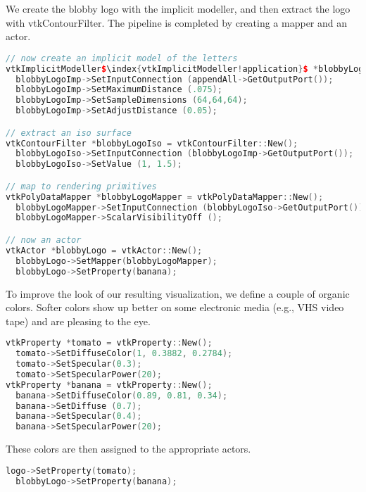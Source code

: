 We create the blobby logo with the implicit modeller, and then extract the logo with vtkContourFilter. The pipeline is completed by creating a mapper and an actor.

\begin{lstlisting}[language=C++, caption={Create an implicit model of the letters and extract the logo.}, escapechar=\$]
// now create an implicit model of the letters
vtkImplicitModeller$\index{vtkImplicitModeller!application}$ *blobbyLogoImp = vtkImplicitModeller::New();
  blobbyLogoImp->SetInputConnection (appendAll->GetOutputPort());
  blobbyLogoImp->SetMaximumDistance (.075);
  blobbyLogoImp->SetSampleDimensions (64,64,64);
  blobbyLogoImp->SetAdjustDistance (0.05);

// extract an iso surface
vtkContourFilter *blobbyLogoIso = vtkContourFilter::New();
  blobbyLogoIso->SetInputConnection (blobbyLogoImp->GetOutputPort());
  blobbyLogoIso->SetValue (1, 1.5);

// map to rendering primitives
vtkPolyDataMapper *blobbyLogoMapper = vtkPolyDataMapper::New();
  blobbyLogoMapper->SetInputConnection (blobbyLogoIso->GetOutputPort());
  blobbyLogoMapper->ScalarVisibilityOff ();

// now an actor
vtkActor *blobbyLogo = vtkActor::New();
  blobbyLogo->SetMapper(blobbyLogoMapper);
  blobbyLogo->SetProperty(banana);
\end{lstlisting}

To improve the look of our resulting visualization, we define a couple of organic colors. Softer colors show up better on some electronic media (e.g., VHS video tape) and are pleasing to the eye.

\begin{lstlisting}[language=C++, caption={Define colors.}]
vtkProperty *tomato = vtkProperty::New();
  tomato->SetDiffuseColor(1, 0.3882, 0.2784);
  tomato->SetSpecular(0.3);
  tomato->SetSpecularPower(20);
vtkProperty *banana = vtkProperty::New();
  banana->SetDiffuseColor(0.89, 0.81, 0.34);
  banana->SetDiffuse (0.7);
  banana->SetSpecular(0.4);
  banana->SetSpecularPower(20);
\end{lstlisting}

These colors are then assigned to the appropriate actors.

\begin{lstlisting}[language=C++, caption={Assign colors to the appropriate actors.}]
  logo->SetProperty(tomato);
  blobbyLogo->SetProperty(banana);
\end{lstlisting}

